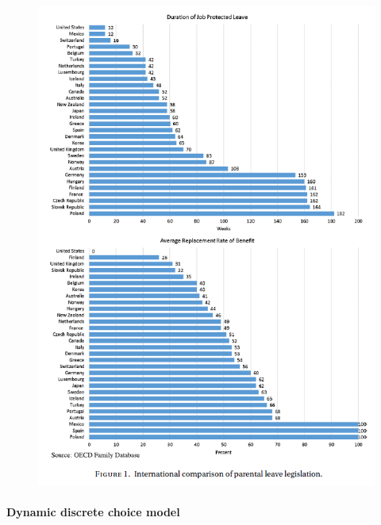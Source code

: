 \documentclass[../root]{subfiles}
\begin{document}
    \begin{figure}
      \centering
      \includegraphics[scale = 1.3]{0619tanji/F1}
      \label{F1}
    \end{figure}

    \paragraph{Dynamic discrete choice model}
\end{document}

